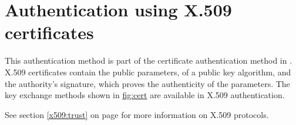 \section{Authentication using X.509 certificates}

This authentication method is part of the certificate authentication
method in \gnutls{}.
X.509 certificates contain the public parameters, 
of a public key algorithm, and the authority's signature, which proves the
authenticity of the parameters.
The key exchange methods shown in \hyperref{figure}{figure }{}{fig:cert} are
available in X.509 authentication. 
\par
See section \ref{x509:trust} on page \pageref{x509:trust} for more information
on X.509 protocols.
